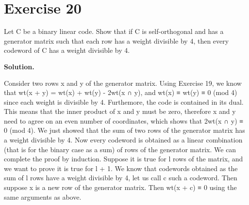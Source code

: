 \documentclass[11pt]{article}
\begin{document}
\section*{Exercise 20}
\begin{exercisebox}
Let C be a binary linear code. Show that if C is self-orthogonal and has a generator matrix such that each row has a weight divisible by 4, then every codeword of C has a weight divisible by 4.

\end{exercisebox}
\begin{solutionbox}
\textbf{Solution.}

Consider two rows x and y of the generator matrix. Using Exercise 19, we know that wt(x + y) = wt(x) + wt(y) - 2wt(x ∩ y), and wt(x) ≡ wt(y) ≡ 0 (mod 4) since each weight is divisible by 4. Furthemore, the code is contained in its dual. This means that the inner product of x and y must be zero, therefore x and y need to agree on an even number of coordinates, which shows that 2wt(x ∩ y) ≡ 0 (mod 4). We just showed that the sum of two rows of the generator matrix has a weight divisible by 4. Now every codeword is obtained as a linear combination (that is for the binary case as a sum) of rows of the generator matrix. We can complete the proof by induction. Suppose it is true for l rows of the matrix, and we want to prove it is true for l + 1. We know that codewords obtained as the sum of l rows have a weight divisible by 4, let us call c such a codeword. Then suppose x is a new row of the generator matrix. Then wt(x + c) ≡ 0 using the same arguments as above.

\end{solutionbox}
\end{document}
